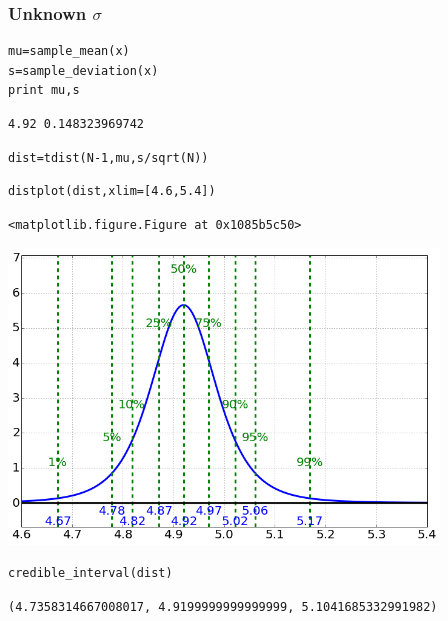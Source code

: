 \subsubsection{Unknown $\sigma$}


\begin{lstlisting}
mu=sample_mean(x)
s=sample_deviation(x)
print mu,s
\end{lstlisting}

\begin{verbatim}
4.92 0.148323969742
\end{verbatim}

\begin{lstlisting}
dist=tdist(N-1,mu,s/sqrt(N))
\end{lstlisting}

\begin{lstlisting}
distplot(dist,xlim=[4.6,5.4])
\end{lstlisting}

\begin{verbatim}
<matplotlib.figure.Figure at 0x1085b5c50>\end{verbatim}

\begin{center}\includegraphics[width=4.5in]{Priors_Likelihoods_and_Posteriors/Priors_Likelihoods_and_Posteriors_fig1.png}\end{center}

\begin{lstlisting}
credible_interval(dist)
\end{lstlisting}

\begin{verbatim}
(4.7358314667008017, 4.9199999999999999, 5.1041685332991982)
\end{verbatim}

\begin{lstlisting}

\end{lstlisting}

